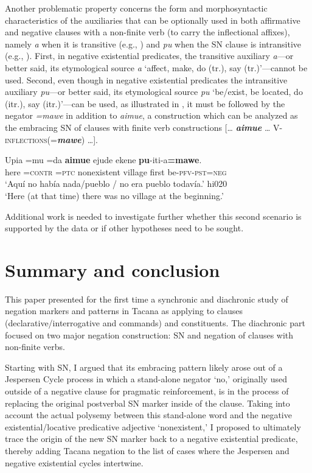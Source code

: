 \documentclass[output=paper]{langsci/langscibook}
\begin{document}
Another problematic property concerns the form and morphosyntactic
characteristics of the auxiliaries that can be optionally used in both
affirmative and negative clauses with a non-finite verb (to carry the
inflectional affixes), namely \textit{a} when it is transitive (e.g.,
) and \textit{pu} when the SN clause is
intransitive (e.g., ). First, in negative
existential predicates, the transitive auxiliary \textit{a}---or better
said, its etymological source \textit{a} `affect, make, do (tr.), say
(tr.)'---cannot be used. Second, even though in negative existential
predicates the intransitive auxiliary \textit{pu}---or better said, its
etymological source \textit{pu} `be\slash exist, be located, do (itr.), say
(itr.)'---can be used, as illustrated in , it must
be followed by the negator \textit{=mawe} in addition to \textit{aimue}, a
construction which can be analyzed as the embracing SN of clauses with
finite verb constructions [… \textbf{\textit{aimue}} …
V-\textsc{inflections}(=\textbf{\textit{mawe}}) …].
%
\begin{exe}\ex
\label{ex:tacana-beginning}
\gll Upia  =mu  =da  \textbf{aimue}  ejude  ekene
\textbf{pu}{-iti-a}\textbf{=mawe}.\\
  here  =\textsc{contr}  \textsc{=ptc}  nonexistent  village  first
  be\textsc{-pfv-pst=neg}\\
\glt `Aquí no había nada/pueblo / no era pueblo todavía.' hi020\\
`Here (at that time) there was no village at the beginning.'
\end{exe}

Additional work is needed to investigate further whether this second scenario is supported by the data or if other hypotheses need to be sought.

\section{Summary and conclusion}\label{sec:tacana-11}

This paper presented for the first time a synchronic and diachronic study of negation markers and patterns in Tacana as applying to clauses (declarative\slash interrogative and commands) and constituents. The diachronic part focused on two major negation construction: SN and negation of clauses with non-finite verbs.

Starting with SN, I argued that its embracing pattern likely arose out of a
Jespersen Cycle process in which a stand-alone negator `no,' originally
used outside of a negative clause for pragmatic reinforcement, is in the
process of replacing the original postverbal SN marker inside of the
clause. Taking into account the actual polysemy between this stand-alone
word and the negative existential\slash locative predicative adjective
‘nonexistent,' I proposed to ultimately trace the origin of the new SN
marker back to a negative existential predicate, thereby adding Tacana
negation to the list of cases where the Jespersen and negative existential cycles intertwine.
\end{document}
